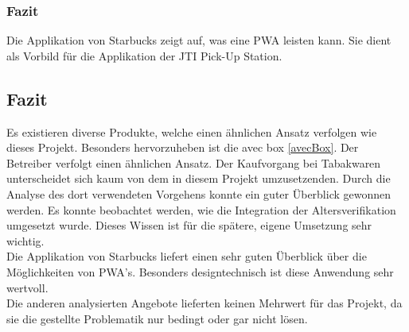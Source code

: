 \subsubsection{Fazit}
Die Applikation von Starbucks zeigt auf, was eine \gls{PWA} leisten kann. Sie dient als Vorbild für die Applikation der \ac{JTI} Pick-Up Station. 


\subsection{Fazit}
Es existieren diverse Produkte, welche einen ähnlichen Ansatz verfolgen wie dieses Projekt. Besonders hervorzuheben ist die avec box \ref{avecBox}. Der Betreiber verfolgt einen ähnlichen Ansatz. 
Der Kaufvorgang bei Tabakwaren unterscheidet sich kaum von dem in diesem Projekt umzusetzenden. Durch die Analyse des dort verwendeten Vorgehens konnte ein guter Überblick gewonnen werden. Es konnte beobachtet werden, wie die Integration der Altersverifikation umgesetzt wurde. Dieses Wissen ist für die spätere, eigene Umsetzung sehr wichtig. \\
Die Applikation von Starbucks liefert einen sehr guten Überblick über die Möglichkeiten von \gls{PWA}'s. Besonders designtechnisch ist diese Anwendung sehr wertvoll.\\
Die anderen analysierten Angebote lieferten keinen Mehrwert für das Projekt, da sie die gestellte Problematik nur bedingt oder gar nicht lösen.  

\newpage 